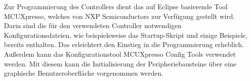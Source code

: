 Zur Programmierung des Controllers dient das auf Eclipse basierende Tool \glqq{}MCUXpresso\grqq{}, welches von NXP Semiconductors zur Verfügung gestellt wird. Darin sind die für den verwendeten Controller notwendigen Konfigurationsdateien, wie beispielsweise das Startup-Skript und einige Beispiele, bereits enthalten. Das erleichtert den Einstieg in die Programmierung erheblich. Außerdem kann das Konfigurationstool \glqq{}MCUXpresso Config Tools\grqq{} verwendet werden. Mit diesem kann die Initialisierung der Peripheriebausteine über eine graphische Benutzeroberfläche vorgenommen werden.

\newpage